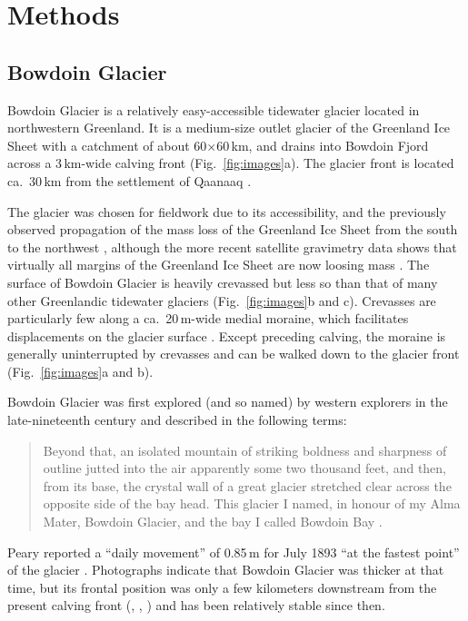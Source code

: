 \documentclass[utf8]{article}
\begin{document}
\section{Methods}

\subsection{Bowdoin Glacier}

    Bowdoin Glacier is a relatively easy-accessible tidewater glacier located
    in northwestern Greenland. It is a medium-size outlet glacier of the Greenland
    Ice Sheet with a catchment of about 60$\times$60\,km, and drains into
    Bowdoin Fjord across a 3\,km-wide calving front
    (Fig.~\ref{fig:images}a). The glacier front is located ca.~30\,km from
    the settlement of Qaanaaq \citep[Fig.~1]{Sugiyama.etal.2015}.

    The glacier was chosen for fieldwork due to its accessibility, and the
    previously observed propagation of the mass loss of the Greenland Ice Sheet
    from the south to the northwest \citep{Khan.etal.2010}, although the more
    recent satellite gravimetry
    data shows that virtually all margins of the Greenland Ice Sheet are now
    loosing mass \citep{Groh.Horwath.2016}. The surface of Bowdoin Glacier
    is heavily crevassed but less so than that of many other Greenlandic
    tidewater glaciers (Fig.~\ref{fig:images}b and c). Crevasses are
    particularly few along a ca.~20\,m-wide medial moraine, which facilitates
    displacements on the glacier surface \citep[Figs.~68]{Chamberlin.1897}.
    Except preceding calving, the moraine is generally uninterrupted by
    crevasses and can be walked down to the glacier front
    (Fig.~\ref{fig:images}a and b).

    Bowdoin Glacier was first explored (and so named) by western explorers in
    the late-nineteenth century and described in the following terms:
    \begin{quote}
        Beyond that, an isolated mountain of striking boldness and sharpness of
        outline jutted into the air apparently some two thousand feet, and
        then, from its base, the crystal wall of a great glacier stretched
        clear across the opposite side of the bay head. This glacier I named,
        in honour of my Alma Mater, Bowdoin Glacier, and the bay I called
        Bowdoin Bay \citep[p.~393--394]{Peary.1898}.
    \end{quote}
    Peary reported a ``daily movement'' of 0.85\,m for July 1893 ``at the
    fastest point'' of the glacier \citep{Chamberlin.1894}.
    Photographs indicate that Bowdoin Glacier was thicker at that time, but its
    frontal position was only a few kilometers downstream from the present
    calving front (\citealp[p.~668]{Chamberlin.1895}, \citealp[Figs.~64
    and~65]{Chamberlin.1897}, \citealp[Fig.~1]{Podolskiy.etal.2016}) and has
    been relatively stable since then.
\end{document}

